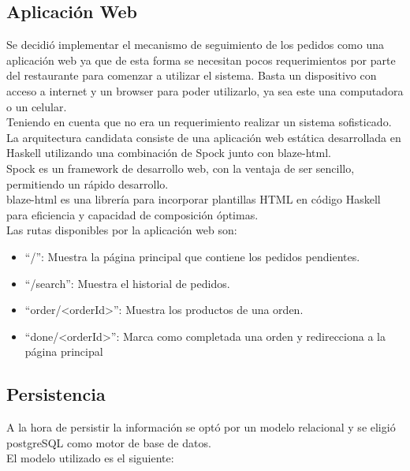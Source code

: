 \documentclass[a4paper,12pt]{article}
\begin{document}
\subsection{Aplicación Web}

Se decidió implementar el mecanismo de seguimiento de los pedidos como una aplicación web ya que de esta forma se necesitan pocos requerimientos por parte del restaurante para comenzar a utilizar el sistema. Basta un dispositivo con acceso a internet y un browser para poder utilizarlo, ya sea este una computadora o un celular.
\\
Teniendo en cuenta que no era un requerimiento realizar un sistema sofisticado. La arquitectura candidata consiste de una aplicación web estática desarrollada en Haskell utilizando una combinación de Spock junto con blaze-html.
\\
Spock \cite{spock} es un framework de desarrollo web, con la ventaja de ser sencillo, permitiendo un rápido desarrollo.
\\
blaze-html \cite{blaze-html} es una librería para incorporar plantillas HTML en código Haskell para eficiencia y capacidad de composición óptimas.
\\
Las rutas disponibles por la aplicación web son:

\begin{itemize}
	\item 
	\color{blue}“/”\color{black}: Muestra la página principal que contiene los pedidos pendientes.
	\item 
	\color{blue}“/search”\color{black}: Muestra el historial de pedidos.
	\item
	\color{blue}“order/<orderId>”\color{black}: Muestra los productos de una orden.
	\item
	\color{blue}“done/<orderId>”\color{black}: Marca como completada una orden y redirecciona a la página principal
\end{itemize}

\subsection{Persistencia}

A la hora de persistir la información se optó por un modelo relacional y se eligió postgreSQL como motor de base de datos.
\\
El modelo utilizado es el siguiente:
\end{document}
